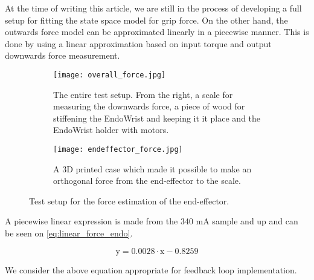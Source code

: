 


At the time of writing this article, we are still in the process of developing a full setup for fitting the state space model for grip force.
On the other hand, the outwards force model can be approximated linearly in a piecewise manner.
This is done by using a linear approximation based on input torque and output downwards force measurement.


\begin{figure}
  \centering
  \begin{subfigure}{.45\linewidth}
  \vspace{30pt}
    \centering
    \texttt{[image: overall\_force.jpg]}
    \caption{The entire test setup. From the right, a scale for measuring the downwards force, a piece of wood for stiffening the EndoWrist and keeping it it place and the EndoWrist holder with motors.}
    \label{fig:entire_force_testsetup}
  \end{subfigure}
  \begin{subfigure}{.45\linewidth}
    \centering
    \texttt{[image: endeffector\_force.jpg]}
    \caption{A 3D printed case which made it possible to make an orthogonal force from the end-effector to the scale.}
    \label{fig:endeffector_force}
  \end{subfigure}
\caption{Test setup for the force estimation of the end-effector.}
\label{fig:Overview_force}
\end{figure}


A piecewise linear expression is made from the 340 mA sample and up and can be seen on \eqref{eq:linear_force_endo}.


\begin{equation}
\text{y} = 0.0028 \cdot \text{x} -0.8259
\label{eq:linear_force_endo}
\end{equation}


We consider the above equation appropriate for feedback loop implementation.
